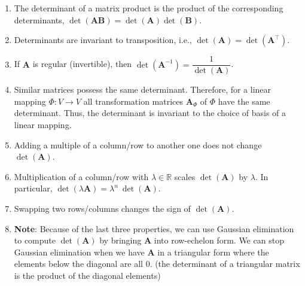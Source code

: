 \begin{enumerate}
    \item The determinant of a matrix product is the product of the corresponding determinants, $\det(\bm{AB}) = \det(\bm{A})\det(\bm{B})$.
    \hfill \cite{mfml/book/mml/Deisenroth-Faisal-Ong}

    \item Determinants are invariant to transposition, i.e., $\det(\bm{A}) = \det(\bm{A}^\top)$.
    \hfill \cite{mfml/book/mml/Deisenroth-Faisal-Ong}

    \item If $\bm{A}$ is regular (invertible), then $\det(\bm{A} ^{-1} ) = \dfrac{1} {\det(\bm{A})}$.
    \hfill \cite{mfml/book/mml/Deisenroth-Faisal-Ong}

    \item Similar matrices possess the same determinant. 
    Therefore, for a linear mapping $\Phi : V \to V$ all transformation matrices $\bm{A}_\Phi$ of $\Phi$ have the same determinant. 
    Thus, the determinant is invariant to the choice of basis of a linear mapping.
    \hfill \cite{mfml/book/mml/Deisenroth-Faisal-Ong}

    \item Adding a multiple of a column/row to another one does not change $\det(\bm{A})$.
    \hfill \cite{mfml/book/mml/Deisenroth-Faisal-Ong}

    \item Multiplication of a column/row with $\lambda \in \mathbb{R}$ scales $\det(\bm{A})$ by $\lambda$. 
    In particular, $\det(\lambda \bm{A}) = \lambda^ n \ \det(\bm{A})$.
    \hfill \cite{mfml/book/mml/Deisenroth-Faisal-Ong}

    \item Swapping two rows/columns changes the sign of $\det(\bm{A})$.
    \hfill \cite{mfml/book/mml/Deisenroth-Faisal-Ong}

    \item[] \textbf{Note}: Because of the last three properties, we can use Gaussian elimination to compute $\det(\bm{A})$ by bringing $\bm{A}$ into row-echelon form. 
    We can stop Gaussian elimination when we have $\bm{A}$ in a triangular form where the elements below the diagonal are all $0$. 
    (the determinant of a triangular matrix is the product of the diagonal elements)
\end{enumerate}










